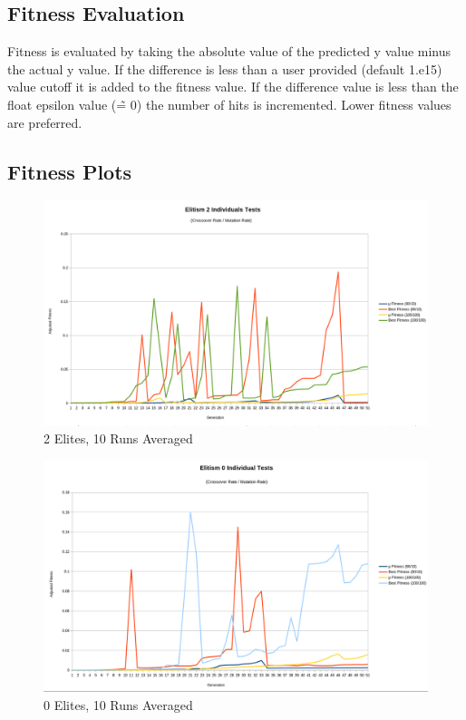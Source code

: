 \documentclass[]{report}
\begin{document}
\subsection{Fitness Evaluation}
Fitness is evaluated by taking the absolute value of the predicted y value minus the actual y value. 
If the difference is less than a user provided (default 1.e15) value cutoff it is added to the fitness value. If the difference value is less than the float epsilon value (\~= 0) the number of hits is incremented. Lower fitness values are preferred.  
\subsection{Fitness Plots}
\begin{figure}[H]
	\centering
	\includegraphics[width=1.0\linewidth]{fp5}
	\caption{2 Elites, 10 Runs Averaged}
	\label{fig:fp4}
\end{figure}
\begin{figure}[H]
	\centering
	\includegraphics[width=1.0\linewidth]{fp3}
	\caption[]{0 Elites, 10 Runs Averaged}
	\label{fig:fp2}
\end{figure}
\end{document}
